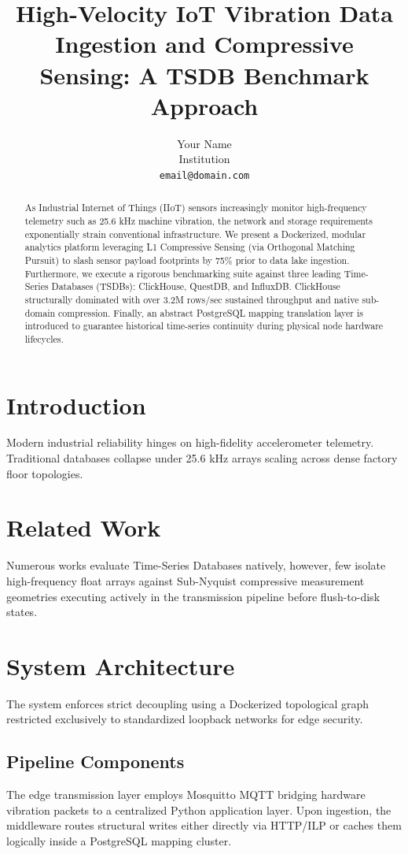\documentclass[10pt,twocolumn,letterpaper]{article}
\title{High-Velocity IoT Vibration Data Ingestion and Compressive Sensing: A TSDB Benchmark Approach}
\author{Your Name \\ Institution \\ {\tt email@domain.com}}
\begin{document}
\maketitle

\begin{abstract}
As Industrial Internet of Things (IIoT) sensors increasingly monitor high-frequency telemetry such as 25.6 kHz machine vibration, the network and storage requirements exponentially strain conventional infrastructure. We present a Dockerized, modular analytics platform leveraging L1 Compressive Sensing (via Orthogonal Matching Pursuit) to slash sensor payload footprints by 75\% prior to data lake ingestion. Furthermore, we execute a rigorous benchmarking suite against three leading Time-Series Databases (TSDBs): ClickHouse, QuestDB, and InfluxDB. ClickHouse structurally dominated with over 3.2M rows/sec sustained throughput and native sub-domain compression. Finally, an abstract PostgreSQL mapping translation layer is introduced to guarantee historical time-series continuity during physical node hardware lifecycles.
\end{abstract}

\section{Introduction}
Modern industrial reliability hinges on high-fidelity accelerometer telemetry. Traditional databases collapse under 25.6 kHz arrays scaling across dense factory floor topologies. 

\section{Related Work}
Numerous works evaluate Time-Series Databases natively, however, few isolate high-frequency float arrays against Sub-Nyquist compressive measurement geometries executing actively in the transmission pipeline before flush-to-disk states.

\section{System Architecture}
The system enforces strict decoupling using a Dockerized topological graph restricted exclusively to standardized loopback networks for edge security. 

\subsection{Pipeline Components}
The edge transmission layer employs Mosquitto MQTT bridging hardware vibration packets to a centralized Python application layer. Upon ingestion, the middleware routes structural writes either directly via HTTP/ILP or caches them logically inside a PostgreSQL mapping cluster. 
\end{document}
